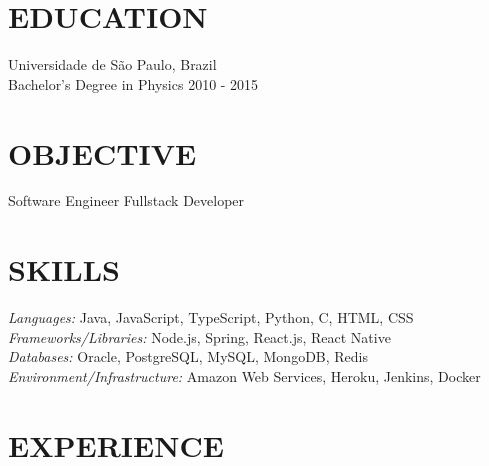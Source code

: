 \documentclass[margin, 10pt]{res} %
\begin{document}
\begin{resume}


\section{EDUCATION}

Universidade de São Paulo, Brazil \\
Bachelor's Degree in Physics \hfill 2010 - 2015


\section{OBJECTIVE}

Software Engineer \textbar\space Fullstack Developer
 

\section{SKILLS}

{\sl Languages:} Java, JavaScript, TypeScript, Python, C, HTML, CSS \\
{\sl Frameworks/Libraries:} Node.js, Spring, React.js, React Native \\
{\sl Databases:} Oracle, PostgreSQL, MySQL, MongoDB, Redis \\
{\sl Environment/Infrastructure:} Amazon Web Services, Heroku, Jenkins, Docker
 
 
\section{EXPERIENCE}


\end{resume}
\end{document}
